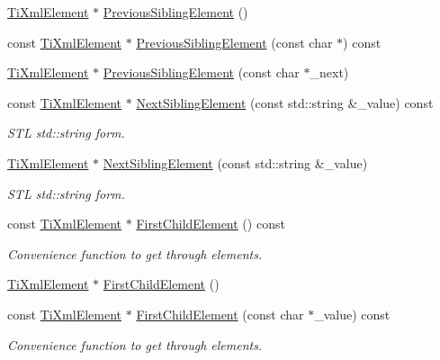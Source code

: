 \begin{DoxyCompactItemize}
\item 
\hyperlink{class_ti_xml_element}{Ti\+Xml\+Element} $\ast$ \hyperlink{class_ti_xml_node_a9f7092efa127c3190df5cf3cb97e887d}{Previous\+Sibling\+Element} ()
\item 
const \hyperlink{class_ti_xml_element}{Ti\+Xml\+Element} $\ast$ \hyperlink{class_ti_xml_node_a6ecef83c4e10c9d0987f09f3ee08de82}{Previous\+Sibling\+Element} (const char $\ast$) const
\item 
\hyperlink{class_ti_xml_element}{Ti\+Xml\+Element} $\ast$ \hyperlink{class_ti_xml_node_a976f74fdd0e49a53502ebf1eda8e63a9}{Previous\+Sibling\+Element} (const char $\ast$\+\_\+next)
\item 
const \hyperlink{class_ti_xml_element}{Ti\+Xml\+Element} $\ast$ \hyperlink{class_ti_xml_node_a2dd7a81689a717fe5d15b3520879ff00}{Next\+Sibling\+Element} (const std\+::string \&\+\_\+value) const
\begin{DoxyCompactList}\small\item\em S\+TL std\+::string form. \end{DoxyCompactList}\item 
\hyperlink{class_ti_xml_element}{Ti\+Xml\+Element} $\ast$ \hyperlink{class_ti_xml_node_a506958e34406729a4e4c5326ea39d081}{Next\+Sibling\+Element} (const std\+::string \&\+\_\+value)
\begin{DoxyCompactList}\small\item\em S\+TL std\+::string form. \end{DoxyCompactList}\item 
const \hyperlink{class_ti_xml_element}{Ti\+Xml\+Element} $\ast$ \hyperlink{class_ti_xml_node_a12c973e1da9e90a178924b8ea5a5f4d1}{First\+Child\+Element} () const
\begin{DoxyCompactList}\small\item\em Convenience function to get through elements. \end{DoxyCompactList}\item 
\hyperlink{class_ti_xml_element}{Ti\+Xml\+Element} $\ast$ \hyperlink{class_ti_xml_node_aa0fecff1f3866ab33a8a25506e95db1d}{First\+Child\+Element} ()
\item 
const \hyperlink{class_ti_xml_element}{Ti\+Xml\+Element} $\ast$ \hyperlink{class_ti_xml_node_aab23fca4c2455c1d926c35d85a663842}{First\+Child\+Element} (const char $\ast$\+\_\+value) const
\begin{DoxyCompactList}\small\item\em Convenience function to get through elements. \end{DoxyCompactList}\item 

\end{DoxyCompactItemize}
